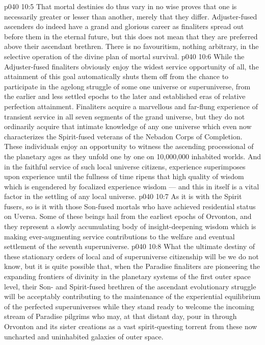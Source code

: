 \vs p040 10:5 \pc That mortal destinies do thus vary in no wise proves that one is necessarily greater or lesser than another, merely that they differ. Adjuster\hyp{}fused ascenders do indeed have a grand and glorious career as finaliters spread out before them in the eternal future, but this does not mean that they are preferred above their ascendant brethren. There is no favouritism, nothing arbitrary, in the selective operation of the divine plan of mortal survival.
\vs p040 10:6 \pc While the Adjuster\hyp{}fused finaliters obviously enjoy the widest service opportunity of all, the attainment of this goal automatically shuts them off from the chance to participate in the agelong struggle of some one universe or superuniverse, from the earlier and less settled epochs to the later and established eras of relative perfection attainment. Finaliters acquire a marvellous and far\hyp{}flung experience of transient service in all seven segments of the grand universe, but they do not ordinarily acquire that intimate knowledge of any one universe which even now characterizes the Spirit\hyp{}fused veterans of the Nebadon Corps of Completion. These individuals enjoy an opportunity to witness the ascending processional of the planetary ages as they unfold one by one on 10,000,000 inhabited worlds. And in the faithful service of such local universe citizens, experience superimposes upon experience until the fullness of time ripens that high quality of wisdom which is engendered by focalized experience  wisdom --- and this in itself is a vital factor in the settling of any local universe.
\vs p040 10:7 As it is with the Spirit fusers, so is it with those Son\hyp{}fused mortals who have achieved residential status on Uversa. Some of these beings hail from the earliest epochs of Orvonton, and they represent a slowly accumulating body of insight\hyp{}deepening wisdom which is making ever\hyp{}augmenting service contributions to the welfare and eventual settlement of the seventh superuniverse.
\vs p040 10:8 \pc What the ultimate destiny of these stationary orders of local and of superuniverse citizenship will be we do not know, but it is quite possible that, when the Paradise finaliters are pioneering the expanding frontiers of divinity in the planetary systems of the first outer space level, their Son\hyp{} and Spirit\hyp{}fused brethren of the ascendant evolutionary struggle will be acceptably contributing to the maintenance of the experiential equilibrium of the perfected superuniverses while they stand ready to welcome the incoming stream of Paradise pilgrims who may, at that distant day, pour in through Orvonton and its sister creations as a vast spirit\hyp{}questing torrent from these now uncharted and uninhabited galaxies of outer space.

